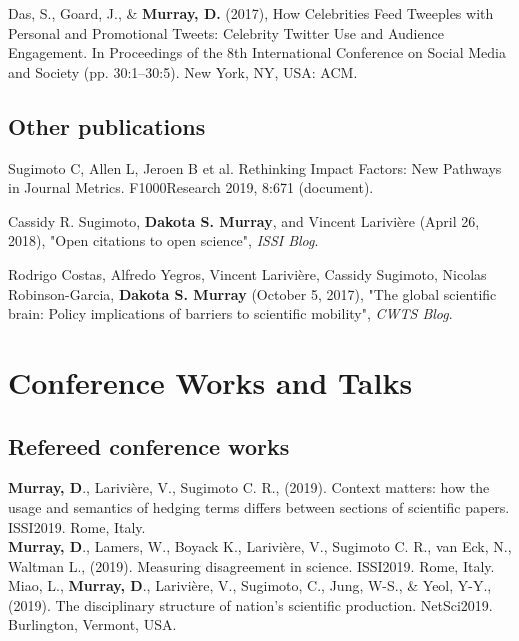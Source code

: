 \documentclass[10pt, a4paper]{article}
\newcommand{\years}[1]{\marginnote{\scriptsize #1}}
\begin{document}
\years{2017} \hangindent=0.7cm Das, S., Goard, J., \& \textbf{Murray, D.} (2017), How Celebrities Feed Tweeples with Personal and Promotional Tweets: Celebrity Twitter Use and Audience Engagement. In Proceedings of the 8th International Conference on Social Media and Society (pp. 30:1–30:5). New York, NY, USA: ACM. 

\subsection*{Other publications}
\noindent

\years{2019} \hangindent=0.7cm Sugimoto C, Allen L, Jeroen B et al. Rethinking Impact Factors: New Pathways in Journal Metrics. F1000Research 2019, 8:671 (document). 

\years{2018} \hangindent=0.7cm Cassidy R. Sugimoto, \textbf{Dakota S. Murray}, and Vincent Larivière (April 26, 2018), "Open citations to open science", \emph{ISSI Blog}. 

\years{2017} \hangindent=0.7cm Rodrigo Costas, Alfredo Yegros, Vincent Larivière, Cassidy Sugimoto, Nicolas Robinson-Garcia, \textbf{Dakota S. Murray} (October 5, 2017), "The global scientific brain: Policy implications of barriers to scientific mobility", \emph{CWTS Blog}. 

\section*{Conference Works and Talks}

\subsection*{Refereed conference works}

\years{2019} \hangindent=0.7cm \textbf{Murray, D}., Larivière, V., Sugimoto C. R., (2019). Context matters: how the usage and semantics of hedging terms differs between sections of scientific papers. ISSI2019. Rome, Italy.\\

\years{2019} \hangindent=0.7cm  \textbf{Murray, D}., Lamers, W., Boyack K., Larivière, V., Sugimoto C. R., van Eck, N., Waltman L., (2019). Measuring disagreement in science. ISSI2019. Rome, Italy.\\

\years{2019} \hangindent=0.7cm Miao, L., \textbf{Murray, D}., Larivière, V., Sugimoto, C., Jung, W-S., \&  Yeol, Y-Y., (2019). The disciplinary structure of nation's scientific production. NetSci2019. Burlington, Vermont, USA.\\
\end{document}
